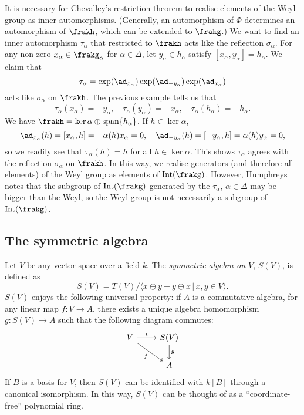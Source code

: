 It is necessary for Chevalley's restriction theorem to realise elements of the Weyl group as inner automorphisms.
(Generally, an automorphism of $\Phi$ determines an automorphism of $\frakh$, which can be extended to $\frakg$.)
We want to find an inner automorphism $\tau_\alpha$ that restricted to $\frakh$ acts like the reflection $\sigma_\alpha$.
For any non-zero $x_\alpha \in \frakg_\alpha$ for $\alpha \in \Delta$, let $y_\alpha \in h_\alpha$ satisfy $[x_\alpha, y_\alpha]=h_\alpha$.
We claim that 
$$\tau_\alpha = \exp(\ad_{x_\alpha})\exp(\ad_{-y_\alpha})\exp(\ad_{x_\alpha})$$
acts like $\sigma_\alpha$ on $\frakh$.
The previous example tells us that
$$\tau_\alpha(x_\alpha) = - y_\alpha, \quad \tau_\alpha(y_\alpha) = - x_\alpha, \quad \tau_\alpha(h_\alpha) = -h_\alpha.$$
We have $\frakh = \ker \alpha \oplus \mathrm{span} \{h_\alpha\}$.
If $h \in \ker \alpha$, 
$$\ad_{x_\alpha}(h) = [x_\alpha, h] = - \alpha(h) x_\alpha = 0,\quad \ad_{-y_\alpha}(h) = [-y_\alpha, h] = \alpha(h) y_\alpha =0,$$
so we readily see that $\tau_\alpha(h) = h$ for all $h \in \ker \alpha$.
This shows $\tau_\alpha$ agrees with the reflection $\sigma_\alpha$ on $\frakh$.
In this way, we realise generators (and therefore all elements) of the Weyl group as elements of $\mathrm{Int}(\frakg)$.
However, Humphreys \cite[\S 14.3]{Humphreys72} notes that the subgroup of $\mathrm{Int}(\frakg)$ generated by the $\tau_\alpha$, $\alpha \in \Delta$ may be bigger than the Weyl, so the Weyl group is not necessarily a subgroup of $\mathrm{Int}(\frakg)$.

\subsection{The symmetric algebra}
Let $V$ be any vector space over a field $k$.
The \emph{symmetric algebra on $V$}, $S(V)$, is defined as
$$S(V) = T(V) /\langle x \oplus y - y \oplus x \, | \, x, y \in V\rangle.$$
$S(V)$ enjoys the following universal property:
if $A$ is a commutative algebra, for any linear map $f: V \to A$, there exists a unique algebra homomorphism $g: S(V) \to A$ such that the following diagram commutes:
\[\begin{tikzcd}
	V & {S(V)} \\
	& A
	\arrow["\iota", from=1-1, to=1-2]
	\arrow["g", from=1-2, to=2-2]
	\arrow["f"', from=1-1, to=2-2]
\end{tikzcd}\]
If $B$ is a basis for $V$, then $S(V)$ can be identified with $k[B]$ through a canonical isomorphism.
In this way, $S(V)$ can be thought of as a ``coordinate-free'' polynomial ring.

